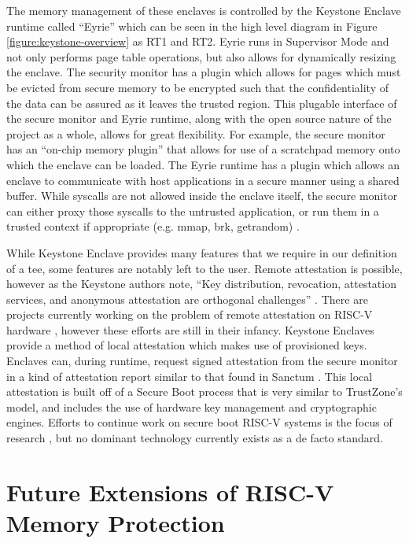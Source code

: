 The memory management of these enclaves is controlled by the Keystone Enclave runtime called ``Eyrie'' which can be seen in the high level diagram in Figure \ref{figure:keystone-overview} as RT1 and RT2. Eyrie runs in Supervisor Mode and not only performs page table operations, but also allows for dynamically resizing the enclave. The security monitor has a plugin which allows for pages which must be evicted from secure memory to be encrypted such that the confidentiality of the data can be assured as it leaves the trusted region. This plugable interface of the secure monitor and Eyrie runtime, along with the open source nature of the project as a whole, allows for great flexibility. For example, the secure monitor has an ``on-chip memory plugin'' \cite{lee2019keystone} that allows for use of a scratchpad memory onto which the enclave can be loaded. The Eyrie runtime has a plugin which allows an enclave to communicate with host applications in a secure manner using a shared buffer. While syscalls are not allowed inside the enclave itself, the secure monitor can either proxy those syscalls to the untrusted application, or run them in a trusted context if appropriate (e.g. mmap, brk, getrandom) \cite{lee2019keystone}.

While Keystone Enclave provides many features that we require in our definition of a \gls{tee}, some features are notably left to the user. Remote attestation is possible, however as the Keystone authors note, ``Key distribution, revocation, attestation services, and anonymous attestation are orthogonal challenges'' \cite{lee2019keystone}. There are projects currently working on the problem of remote attestation on RISC-V hardware \cite{shepherd2021lira}, however these efforts are still in their infancy. Keystone Enclaves provide a method of local attestation which makes use of provisioned keys. Enclaves can, during runtime, request signed attestation from the secure monitor in a kind of attestation report similar to that found in Sanctum \cite{lebedev2018secure}. This local attestation is built off of a Secure Boot process that is very similar to TrustZone's model, and includes the use of hardware key management and cryptographic engines. Efforts to continue work on secure boot RISC-V systems is the focus of research \cite{haj2019lightweight}, but no dominant technology currently exists as a de facto standard.

\section{Future Extensions of RISC-V Memory Protection}

